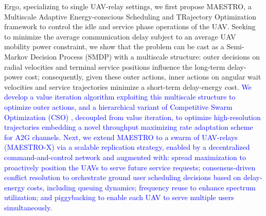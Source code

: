 \documentclass[12pt, draftcls, onecolumn]{IEEEtran}
\theoremstyle{plain}
\theoremstyle{definition}
\theoremstyle{remark}
\newcommand\hlt[1]{\textcolor{blue}{#1}}
\begin{document}
Ergo, specializing to single UAV-relay settings, we first propose MAESTRO, a Multiscale Adaptive Energy-conscious Scheduling and TRajectory Optimization framework to control the idle and service phase operations of the UAV. Seeking to minimize the average communication delay subject to an average UAV mobility power constraint, we show that the problem can be cast as a Semi-Markov Decision Process (SMDP) with a multiscale structure: outer decisions on radial velocities and terminal service positions influence the long-term delay-power cost; consequently, given these outer actions, inner actions on angular wait velocities and service trajectories minimize a short-term delay-energy cost. \hlt{We develop a value iteration algorithm \cite{Bertsekas} exploiting this multiscale structure to optimize outer actions, and a hierarchical variant of Competitive Swarm Optimization (CSO) \cite{CSO}, decoupled from value iteration, to optimize high-resolution trajectories embedding a novel throughput maximizing rate adaptation scheme for A2G channels. Next, we extend MAESTRO to a swarm of UAV-relays (MAESTRO-X) via a scalable replication strategy, enabled by a decentralized command-and-control network and augmented with: spread maximization to proactively position the UAVs to serve future service requests; consensus-driven conflict resolution to orchestrate ground user scheduling decisions based on delay-energy costs, including queuing dynamics; frequency reuse to enhance spectrum utilization; and piggybacking to enable each UAV to serve multiple users simultaneously.}
\end{document}
